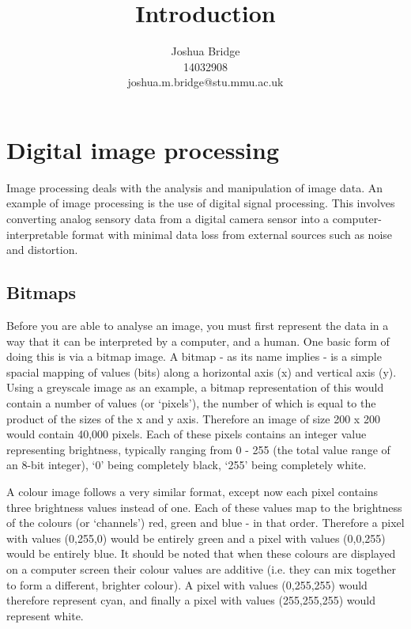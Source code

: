 \documentclass[a4paper,12pt]{article}
\title{Introduction}
\author{Joshua Bridge \\14032908 \\joshua.m.bridge@stu.mmu.ac.uk}
\begin{document}
\maketitle

\tableofcontents

\doublespacing


\section{Digital image processing}
  Image processing deals with the analysis and manipulation of image data. An example of image processing is the use of digital signal processing. This involves converting analog sensory data from a digital camera sensor into a computer-interpretable format with minimal data loss from external sources such as noise and distortion.\\

  \subsection{Bitmaps}
    Before you are able to analyse an image, you must first represent the data in a way that it can be interpreted by a computer, and a human. One basic form of doing this is via a bitmap image. A bitmap - as its name implies - is a simple spacial mapping of values (bits) along a horizontal axis (x) and vertical axis (y). Using a greyscale image as an example, a bitmap representation of this would contain a number of values (or ‘pixels’), the number of which is equal to the product of the sizes of the x and y axis. Therefore an image of size 200 x 200 would contain 40,000 pixels. Each of these pixels contains an integer value representing brightness, typically ranging from 0 - 255 (the total value range of an 8-bit integer), ‘0’ being completely black, ‘255’ being completely white.

    A colour image follows a very similar format, except now each pixel contains three brightness values instead of one. Each of these values map to the brightness of the colours (or ‘channels’) red, green and blue - in that order. Therefore a pixel with values (0,255,0) would be entirely green and a pixel with values (0,0,255) would be entirely blue. It should be noted that when these colours are displayed on a computer screen their colour values are additive (i.e. they can mix together to form a different, brighter colour). A pixel with values (0,255,255) would therefore represent cyan, and finally a pixel with values (255,255,255) would represent white.
\end{document}
